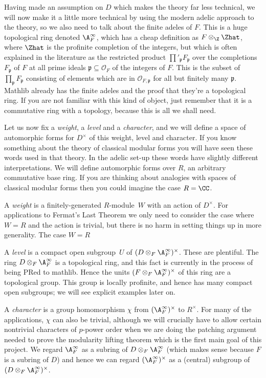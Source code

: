 Having made an assumption on $D$ which makes the theory far less technical, we will now
make it a little more technical by using the modern adelic approach to the theory,
so we also need to talk about the finite adeles of $F$. This is a huge topological ring
denoted $\A_F^\infty$, which has a cheap definition as $F\otimes_{\Z}\Zhat$, where $\Zhat$ is
the profinite completion of the integers, but which is often explained in the literature
as the restricted product $\prod'_{\mathfrak{p}}F_{\mathfrak{p}}$ over the completions
$F_{\mathfrak{p}}$ of $F$ at all prime ideals $\mathfrak{p}\subseteq\mathcal{O}_F$ of the
integers of $F$. This is the subset of $\prod_{\mathfrak{p}}F_{\mathfrak{p}}$ consisting
of elements which are in $\mathcal{O}_{F,\mathfrak{p}}$ for all but finitely many $\mathfrak{p}$.
Mathlib already has the finite adeles and the proof that they're a topological ring. If you are
not familiar with this kind of object, just remember that it is a commutative ring with a topology,
because this is all we shall need.

Let us now fix a \emph{weight}, a \emph{level} and a \emph{character}, and we will define
a space of automorphic forms for $D^\times$ of this weight, level and character. If you know something
about the theory of classical modular forms you will have seen these words used in that theory.
In the adelic set-up these words have slightly different interpretations. We will define automorphic
forms over $R$, an arbitrary commutative base ring. If you are thinking about analogies with
spaces of classical modular forms then you could imagine the case $R=\CC$.

A \emph{weight} is a finitely-generated $R$-module~$W$ with an action of $D^\times$. For applications
to Fermat's Last Theorem we only need to consider the case where $W=R$ and the action is trivial,
but there is no harm in setting things up in more generality. The case $W=R$

A \emph{level} is a compact open subgroup~$U$ of $(D\otimes_F\A_F^\infty)^\times$. These are plentiful.
The ring $D\otimes_F\A_F^\infty$ is a topological ring, and this fact is currently in the process
of being PRed to mathlib. Hence the units $(F\otimes_F\A_F^\infty)^\times$ of this ring are a topological
group. This group is locally profinite, and hence has many compact open subgroups; we will see
explicit examples later on.

A \emph{character} is a group homomorphism $\chi$ from $(\A_F^\infty)^\times$ to $R^\times$. For many
of the applications, $\chi$ can also be trivial, although we will crucially have to allow
certain nontrivial characters of $p$-power order when we are doing the patching argument needed
to prove the modularity lifting theorem which is the first main goal of this project.
We regard $\A_F^\infty$ as a subring of $D\otimes_F\A_F^\infty$ (which makes sense because
$F$ is a subring of $D$) and hence we can regard $(\A_F^\infty)^\times$ as a (central)
subgroup of $(D\otimes_F\A_F^\infty)^\times$.

